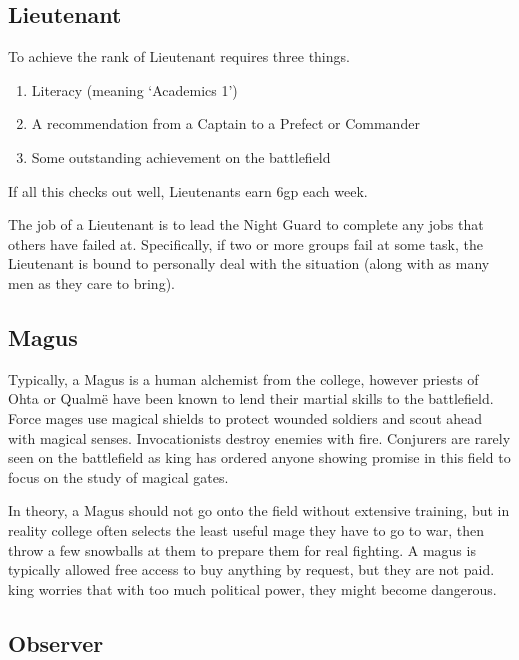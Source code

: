 \begin{multicols}{2}
\subsection{Lieutenant}

To achieve the rank of Lieutenant requires three things.

\begin{enumerate}

\item{Literacy (meaning `Academics 1')}
\item{A recommendation from a Captain to a Prefect or Commander}
\item{Some outstanding achievement on the battlefield}
\end{enumerate}

\noindent
If all this checks out well, Lieutenants earn 6gp each week.

The job of a Lieutenant is to lead the Night Guard to complete any jobs that others have failed at.
Specifically, if two or more groups fail at some task, the Lieutenant is bound to personally deal with the situation (along with as many men as they care to bring).

\subsection{Magus}

Typically, a Magus is a human alchemist from the \gls{college}, however priests of Ohta or Qualm\"e have been known to lend their martial skills to the battlefield.
Force mages use magical shields to protect wounded soldiers and scout ahead with magical senses.
Invocationists destroy enemies with fire.
Conjurers are rarely seen on the battlefield as \gls{king} has ordered anyone showing promise in this field to focus on the study of magical gates.

In theory, a Magus should not go onto the field without extensive training, but in reality \gls{college} often selects the least useful mage they have to go to war, then throw a few snowballs at them to prepare them for real fighting.
A magus is typically allowed free access to buy anything by request, but they are not paid.
\Gls{king} worries that with too much political power, they might become dangerous.

\subsection{Observer}


\end{multicols}
